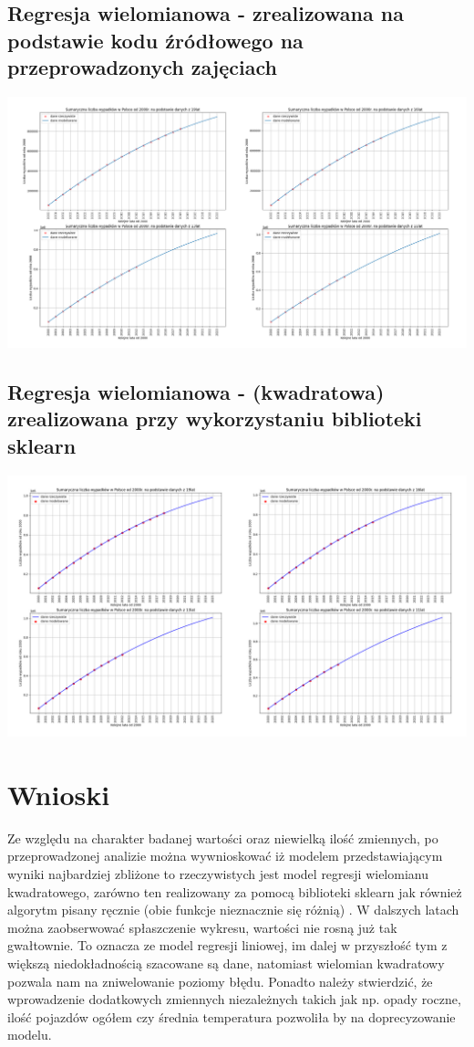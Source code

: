 \documentclass{article}
\begin{document}
\subsection{Regresja wielomianowa - zrealizowana na podstawie kodu źródłowego na przeprowadzonych zajęciach}
 \begin{center}
        \includegraphics[scale=0.18]{wielomianreczny.jpg}
    \end{center}
\subsection{Regresja wielomianowa - (kwadratowa) zrealizowana przy wykorzystaniu biblioteki sklearn}
 \begin{center}
        \includegraphics[scale=0.18]{wielomianbiblioteka.jpg}
    \end{center}
\section{Wnioski}
\qquad Ze względu na charakter badanej wartości oraz niewielką ilość zmiennych, po przeprowadzonej analizie można wywnioskować iż modelem przedstawiającym wyniki najbardziej zbliżone to rzeczywistych jest model regresji wielomianu kwadratowego, zarówno ten realizowany za pomocą biblioteki sklearn jak również algorytm pisany ręcznie (obie funkcje nieznacznie się różnią) . W dalszych latach można zaobserwować spłaszczenie wykresu, wartości nie rosną już tak gwałtownie. To oznacza ze model regresji liniowej, im dalej w przyszłość tym z większą niedokładnością szacowane są dane, natomiast wielomian kwadratowy pozwala nam na zniwelowanie poziomy błędu. Ponadto należy stwierdzić, że wprowadzenie dodatkowych zmiennych niezależnych takich jak np. opady roczne, ilość pojazdów ogółem czy średnia temperatura pozwoliła by na doprecyzowanie modelu.
\end{document}
